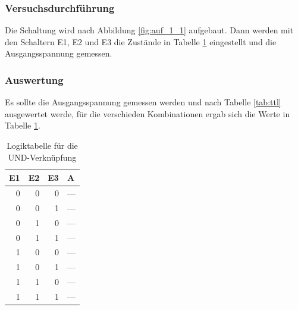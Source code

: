 \documentclass[12pt,a4paper]{article}
\begin{document}
\subsubsection*{Versuchsdurchführung}

Die Schaltung wird nach Abbildung \ref{fig:auf_1_1} aufgebaut. Dann werden mit den Schaltern E1, E2 und E3 die Zustände in Tabelle \ref{tab:1_1} eingestellt und die Ausgangsspannung gemessen.
\subsubsection*{Auswertung}

Es sollte die Ausgangsspannung gemessen werden und nach Tabelle \ref{tab:ttl} ausgewertet werde, für die verschieden Kombinationen ergab sich die Werte in Tabelle \ref{tab:1_1}.

\begin{table}[H]
\begin{center}
\begin{tabular}{r|r|r|l}

\multicolumn{1}{l|}{E1} & \multicolumn{1}{l|}{E2} & \multicolumn{1}{l|}{E3} & A \\ \hline \hline
0 & 0 & 0 & --- \\ 
0 & 0 & 1 & --- \\ 
0 & 1 & 0 & --- \\ 
0 & 1 & 1 & --- \\ 
1 & 0 & 0 & --- \\ 
1 & 0 & 1 & --- \\ 
1 & 1 & 0 & --- \\ 
1 & 1 & 1 & --- \\ 
\end{tabular}
\end{center}
\caption{Logiktabelle für die UND-Verknüpfung}
\label{tab:1_1}
\end{table}
\end{document}
